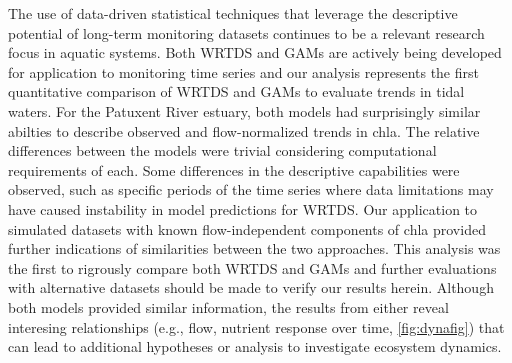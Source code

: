 \documentclass[letterpaper,12pt,oneside]{article}\usepackage[]{graphicx}\usepackage[]{color}
\begin{document}
The use of data-driven statistical techniques that leverage the descriptive potential of long-term monitoring datasets continues to be a relevant research focus in aquatic systems.  Both \ac{WRTDS} and \acp{GAM} are actively being developed for application to monitoring time series and our analysis represents the first quantitative comparison of \ac{WRTDS} and \acp{GAM} to evaluate trends in tidal waters.  For the Patuxent River estuary, both models had surprisingly similar abilties to describe observed and flow-normalized trends in \ac{chla}.  The relative differences between the models were trivial considering computational requirements of each.  Some differences in the descriptive capabilities were observed, such as specific periods of the time series where data limitations may have caused instability in model predictions for \ac{WRTDS}.  Our application to simulated datasets with known flow-independent components of \ac{chla} provided further indications of similarities between the two approaches. This analysis was the first to rigrously compare both \ac{WRTDS} and \acp{GAM} and further evaluations with alternative datasets should be made to verify our results herein. Although both models provided similar information, the results from either reveal interesing relationships (e.g., flow, nutrient response over time, \cref{fig:dynafig}) that can lead to additional hypotheses or analysis to investigate ecosystem dynamics.
\end{document}
